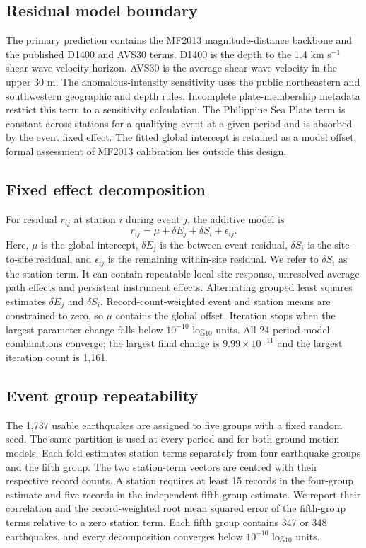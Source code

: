 \documentclass[10pt]{article}
\begin{document}
\subsection*{Residual model boundary}

The primary prediction contains the MF2013 magnitude-distance backbone and the published D1400 and AVS30 terms\cite{morikawa2013,morikawa2023}. D1400 is the depth to the 1.4 km s$^{-1}$ shear-wave velocity horizon. AVS30 is the average shear-wave velocity in the upper 30 m. The anomalous-intensity sensitivity uses the public northeastern and southwestern geographic and depth rules\cite{morikawa2006}. Incomplete plate-membership metadata restrict this term to a sensitivity calculation. The Philippine Sea Plate term is constant across stations for a qualifying event at a given period and is absorbed by the event fixed effect. The fitted global intercept is retained as a model offset; formal assessment of MF2013 calibration lies outside this design.

\subsection*{Fixed effect decomposition}

For residual $r_{ij}$ at station $i$ during event $j$, the additive model is
\begin{equation}
r_{ij}=\mu+\delta E_j+\delta S_i+\epsilon_{ij}.
\end{equation}
Here, $\mu$ is the global intercept, $\delta E_j$ is the between-event residual, $\delta S_i$ is the site-to-site residual, and $\epsilon_{ij}$ is the remaining within-site residual. We refer to $\delta S_i$ as the station term. It can contain repeatable local site response, unresolved average path effects and persistent instrument effects. Alternating grouped least squares estimates $\delta E_j$ and $\delta S_i$. Record-count-weighted event and station means are constrained to zero, so $\mu$ contains the global offset. Iteration stops when the largest parameter change falls below $10^{-10}$ log$_{10}$ units. All 24 period-model combinations converge; the largest final change is $9.99\times10^{-11}$ and the largest iteration count is 1,161.

\subsection*{Event group repeatability}

The 1,737 usable earthquakes are assigned to five groups with a fixed random seed. The same partition is used at every period and for both ground-motion models. Each fold estimates station terms separately from four earthquake groups and the fifth group. The two station-term vectors are centred with their respective record counts. A station requires at least 15 records in the four-group estimate and five records in the independent fifth-group estimate. We report their correlation and the record-weighted root mean squared error of the fifth-group terms relative to a zero station term. Each fifth group contains 347 or 348 earthquakes, and every decomposition converges below $10^{-10}$ log$_{10}$ units.
\end{document}

